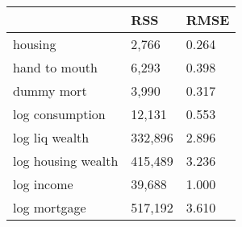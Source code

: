 \begin{table}[htbp]
\begin{tabular}{lll} \hline \hline
 & RSS  & RMSE  \\  \hline 
housing &     2,766 &     0.264 \\  
hand to mouth &     6,293 &     0.398 \\  
dummy mort &     3,990 &     0.317 \\  
log consumption &    12,131 &     0.553 \\  
log liq wealth &   332,896 &     2.896 \\  
log housing wealth &   415,489 &     3.236 \\  
log income &    39,688 &     1.000 \\  
log mortgage &   517,192 &     3.610 \\  
\hline \hline \end{tabular}
\end{table}
